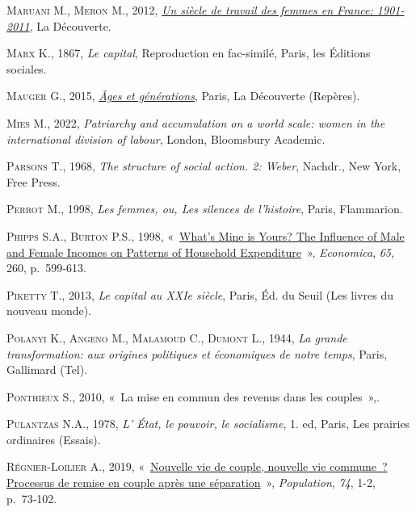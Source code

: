 \documentclass[
  12pt,
]{book}
\newlength{\cslhangindent}
\newenvironment{CSLReferences}[2] %
 {\begin{list}{}{%
  \setlength{\itemindent}{0pt}
  \setlength{\leftmargin}{0pt}
  \setlength{\parsep}{0pt}
  \ifodd #1
   \setlength{\leftmargin}{\cslhangindent}
   \setlength{\itemindent}{-1\cslhangindent}
  \fi
  \setlength{\itemsep}{#2\baselineskip}}}
 {\end{list}}
\begin{document}
\begin{CSLReferences}{0}{1}
\textsc{Maruani M.}, \textsc{Meron M.}, 2012,
\emph{\href{https://doi.org/10.3917/dec.marua.2012.01}{Un siècle de
travail des femmes en France: 1901- 2011}}, La Découverte.

\textsc{Marx K.}, 1867, \emph{Le capital}, Reproduction en fac-similé,
Paris, les Éditions sociales.

\textsc{Mauger G.}, 2015,
\emph{\href{https://www.cairn.info/ages-et-generations--9782707158888.htm}{Âges
et générations}}, Paris, La Découverte (Repères).

\textsc{Mies M.}, 2022, \emph{Patriarchy and accumulation on a world
scale: women in the international division of labour}, London,
Bloomsbury Academic.

\textsc{Parsons T.}, 1968, \emph{The structure of social action. 2:
Weber}, Nachdr., New York, Free Press.

\textsc{Perrot M.}, 1998, \emph{Les femmes, ou, Les silences de
l'histoire}, Paris, Flammarion.

\textsc{Phipps S.A.}, \textsc{Burton P.S.}, 1998,
{«~\href{https://doi.org/10.1111/1468-0335.00148}{What{'}s Mine is
Yours? The Influence of Male and Female Incomes on Patterns of Household
Expenditure}~»}, \emph{Economica}, \emph{65}, 260, p.~599‑613.

\textsc{Piketty T.}, 2013, \emph{Le capital au XXIe siècle}, Paris, Éd.
du Seuil (Les livres du nouveau monde).

\textsc{Polanyi K.}, \textsc{Angeno M.}, \textsc{Malamoud C.},
\textsc{Dumont L.}, 1944, \emph{La grande transformation: aux origines
politiques et économiques de notre temps}, Paris, Gallimard (Tel).

\textsc{Ponthieux S.}, 2010, {«~La mise en commun des revenus dans les
couples~»},.

\textsc{Pulantzas N.A.}, 1978, \emph{L' État, le pouvoir, le
socialisme}, 1. ed, Paris, Les prairies ordinaires (Essais).

\textsc{Régnier-Loilier A.}, 2019,
{«~\href{https://doi.org/10.3917/popu.1901.0073}{Nouvelle vie de couple,
nouvelle vie commune~? Processus de remise en couple après une
séparation}~»}, \emph{Population}, \emph{74}, 1-2, p.~73‑102.


\end{CSLReferences}
\end{document}
